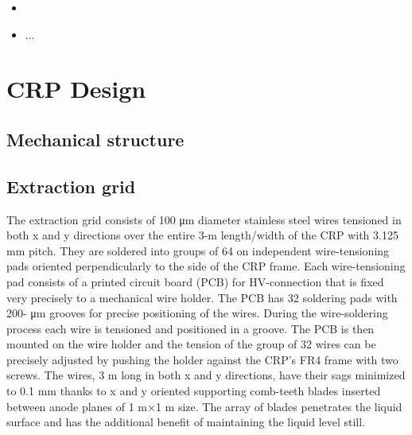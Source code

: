 
\begin{itemize}
\item  
\item  ...
\end{itemize}



\section{CRP Design}
\label{sec:fddp-crp-design}



\subsection{Mechanical structure}
\label{sec:fddp-crp-mechanics}

\subsection{Extraction grid}
\label{sec:fddp-crp-grid}
The extraction grid consists of 100 μm diameter stainless steel wires tensioned in both x and y directions over the entire 3-m length/width of the CRP with 3.125 mm pitch. They are soldered into groups of 64 on independent wire-tensioning pads oriented perpendicularly to the side of the CRP frame. Each wire-tensioning pad consists of a printed circuit board (PCB) for HV-connection that is fixed very precisely to a mechanical wire holder. The PCB has 32 soldering pads with 200- μm grooves for precise positioning of the wires. During the wire-soldering process each wire is tensioned and positioned in a groove. The PCB is then mounted on the wire holder and the tension of the group of 32 wires
can be precisely adjusted by pushing the holder against the CRP’s FR4 frame with two screws. The wires, 3 m long in both x and y directions, have their sags minimized to 0.1 mm thanks to x and y oriented supporting comb-teeth blades  inserted between anode planes of 1 m×1 m size. The array of blades penetrates the liquid surface and has the additional benefit of maintaining the liquid level still.

